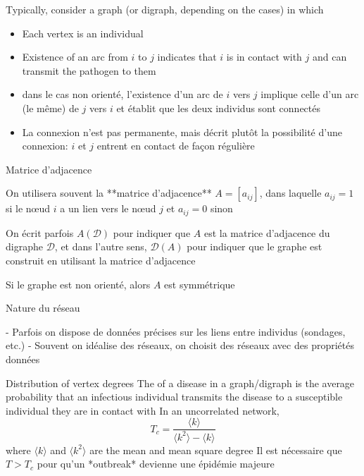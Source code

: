 \documentclass[aspectratio=43]{beamer}
\begin{document}
\begin{frame}
Typically, consider a graph (or digraph, depending on the cases) in which
\begin{itemize}
\item Each vertex is an individual
\item Existence of an arc from $i$ to $j$ indicates that $i$ is in contact with $j$ and can transmit the pathogen to them
\item dans le cas non orienté, l'existence d'un arc de $i$ vers $j$ implique celle d'un arc (le même) de $j$ vers $i$ et établit que les deux individus sont connectés
\item La connexion n'est pas permanente, mais décrit plutôt la possibilité d'une connexion: $i$ et $j$ entrent en contact de façon régulière
\end{itemize}
\end{frame} 


\begin{frame}

 Matrice d'adjacence

On utilisera souvent la **matrice d'adjacence** $A=[a_{ij}]$, dans laquelle $a_{ij}=1$ si le nœud $i$ a un lien vers le nœud $j$ et $a_{ij}=0$ sinon

On écrit parfois $A(\mathcal{D})$ pour indiquer que $A$ est la matrice d'adjacence du digraphe $\mathcal{D}$, et dans l'autre sens, $\mathcal{D}(A)$ pour indiquer que le graphe est construit en utilisant la matrice d'adjacence

Si le graphe est non orienté, alors $A$ est symmétrique

\end{frame} \begin{frame}

 Nature du réseau

- Parfois on dispose de données précises sur les liens entre individus (sondages, etc.)
- Souvent on idéalise des réseaux, on choisit des réseaux avec des propriétés données
\end{frame} 


\begin{frame}{Distribution of vertex degrees}
The  of a disease in a graph/digraph is the average probability that an infectious individual transmits the disease to a susceptible individual they are in contact with
\vfill
In an uncorrelated network,
\[
T_c = \frac{\langle k\rangle}{\langle k^2\rangle-\langle k\rangle}
\]
where $\langle k\rangle$ and $\langle k^2\rangle$ are the mean and mean square degree
\vfill
Il est nécessaire que $T>T_c$ pour qu'un *outbreak* devienne une épidémie majeure
\end{frame}
\end{document}
